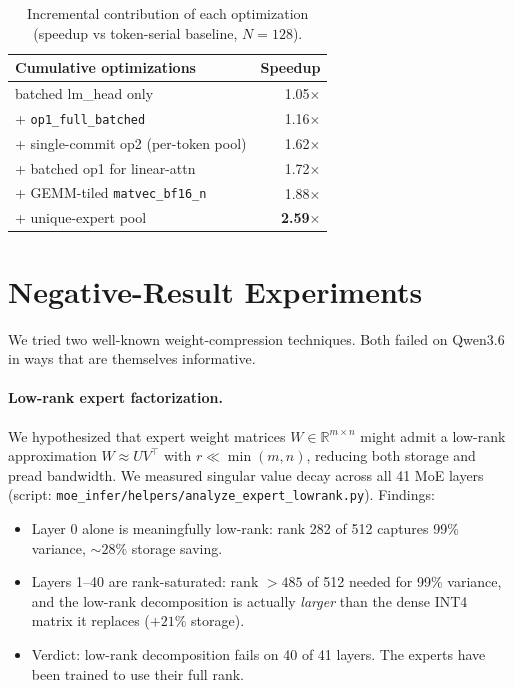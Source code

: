 \documentclass[11pt,a4paper]{article}
\begin{document}
\begin{table}[h]
\centering
\caption{Incremental contribution of each optimization (speedup vs
    token-serial baseline, $N{=}128$).}
\label{tab:incremental}
\begin{tabular}{lr}
\toprule
Cumulative optimizations & Speedup \\
\midrule
batched lm\_head only                          & 1.05$\times$ \\
+ \texttt{op1\_full\_batched}                  & 1.16$\times$ \\
+ single-commit op2 (per-token pool)           & 1.62$\times$ \\
+ batched op1 for linear-attn                  & 1.72$\times$ \\
+ GEMM-tiled \texttt{matvec\_bf16\_n}          & 1.88$\times$ \\
+ unique-expert pool                           & \textbf{2.59}$\times$ \\
\bottomrule
\end{tabular}
\end{table}

\section{Negative-Result Experiments}\label{sec:negative}

We tried two well-known weight-compression techniques. Both failed on
Qwen3.6 in ways that are themselves informative.

\paragraph{Low-rank expert factorization.} We hypothesized that expert
weight matrices $W \in \mathbb{R}^{m \times n}$ might admit a low-rank
approximation $W \approx U V^\top$ with $r \ll \min(m, n)$, reducing
both storage and pread bandwidth. We measured singular value decay
across all 41 MoE layers (script:
\texttt{moe_infer/helpers/analyze\_expert\_lowrank.py}). Findings:
\begin{itemize}
\item Layer 0 alone is meaningfully low-rank: rank 282 of 512 captures
    99\% variance, $\sim 28\%$ storage saving.
\item Layers 1--40 are rank-saturated: rank $> 485$ of 512 needed for
    99\% variance, and the low-rank decomposition is actually
    \emph{larger} than the dense INT4 matrix it replaces ($+21\%$
    storage).
\item Verdict: low-rank decomposition fails on 40 of 41 layers. The
    experts have been trained to use their full rank.
\end{itemize}
\end{document}
